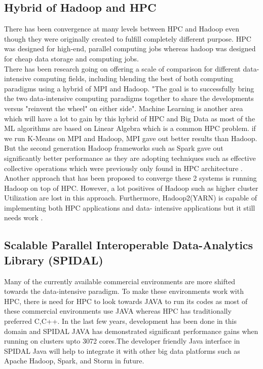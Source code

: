 \documentclass[sigconf]{acmart}
\begin{document}
\subsection{Hybrid of Hadoop and HPC}
There has been convergence at many levels between HPC and Hadoop even though they were originally created to fulfill completely different purpose. HPC was designed for high-end, parallel computing jobs whereas hadoop was designed for cheap data storage and computing jobs. 
\\
There has been research going on offering a scale of comparison for different data-intensive computing fields, including blending the best of both computing paradigms using a hybrid of MPI and Hadoop. "The goal is to successfully bring the two data-intensive computing paradigms together to share the developments versus "reinvent the wheel" on either side"\cite{DBLP:journals/corr/JhaQLMF14}. Machine Learning is another area which will have a lot to gain by this hybrid of HPC and Big Data as most of the ML algorithms are based on Linear Algebra which is a common HPC problem. if we run K-Means on MPI and Hadoop, MPI gave out better results than Hadoop. But the second generation Hadoop frameworks such as Spark gave out significantly better performance as they are adopting techniques such as effective collective operations which were previously only found in HPC architecture \cite{DBLP:journals/corr/abs-1301-6228}. \\
Another approach that has been proposed to converge these 2 systems is running Hadoop on top of HPC. However, a lot positives of Hadoop such as higher cluster Utilization are lost in this approach. Furthermore, Hadoop2(YARN) is capable of implementing both HPC applications and data- intensive applications but it still needs work \cite{DBLP:journals/corr/JhaQLMF14}.

\subsection{Scalable Parallel Interoperable Data-Analytics Library (SPIDAL)}
Many of the currently available commercial environments are more shifted towards the data-intensive paradigm. To make these environments work with HPC, there is need for HPC to look towards JAVA to run its codes as most of these commercial environments use JAVA whereas HPC has traditionally preferred C,C++. In the last few years, development has been done in this domain and SPIDAL JAVA has demonstrated significant performance gains when running on clusters upto 3072 cores\cite{Spidal}.The developer friendly Java interface in SPIDAL Java will help to integrate it with other big data platforms such as Apache Hadoop, Spark, and Storm in future.\cite{Spidal}
\end{document}
